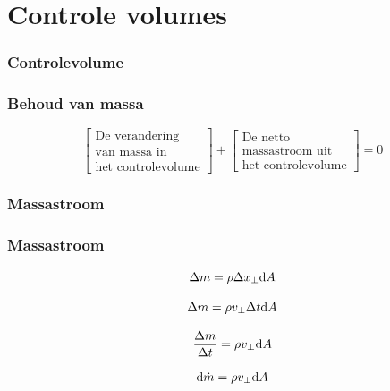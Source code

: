 \documentclass[t]{beamer}
\begin{document}
  	\section{Controle volumes}	
  		\begin{frame}
			\frametitle{Controlevolume}
			\vspace{1cm}
			\center
			
  		\end{frame}
  		\begin{frame}
			\frametitle{Behoud van massa}
			\vspace{2cm}
			\begin{equation}
				\left[
					\begin{array}{c}
						\mbox{De verandering} \\ \mbox{van massa in} \\ \mbox{het controlevolume}
					\end{array}
				\right]
				+
				\left[
					\begin{array}{c}
						\mbox{De netto} \\ \mbox{massastroom uit} \\ \mbox{het controlevolume}
					\end{array}
				\right]
				= 0
				\label{eqn:controlevolume,behoud van massa,woorden}
			\end{equation}
		\end{frame}	
		\begin{frame}
			\frametitle{Massastroom}
			\vspace{1cm}
			\center
			
  		\end{frame}
  		\begin{frame}
  			\frametitle{Massastroom}
  			\begin{equation}
				\Delta m = \rho \Delta x_{\perp} \mathrm{d} A
			\end{equation}
  			
  			\pause
  			\begin{equation}
				\Delta m = \rho v_{\perp} \Delta t \mathrm{d} A
			\end{equation}
			
			\pause
  			\begin{equation}
				\frac{\Delta m}{\Delta t} = \rho v_{\perp} \mathrm{d} A
			\end{equation}
			
			\pause
			\begin{equation}
				\mathrm{d} \dot{m}  = \rho v_{\perp} \mathrm{d} A
				\label{eqn:massastroom}
			\end{equation}
  		\end{frame}
\end{document}
